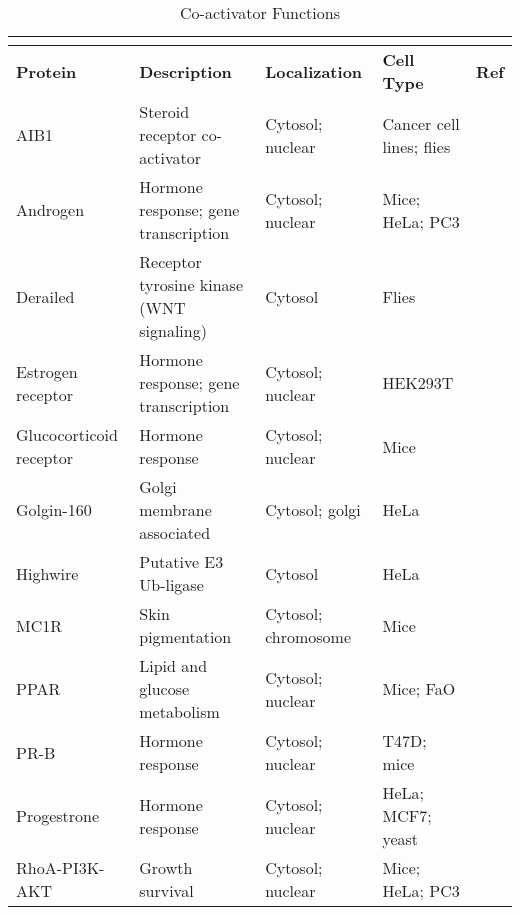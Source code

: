 \begin{longtabu} to \textwidth {X[1,l]X[1.2,l]X[1,l]X[1,l]X[0.4,c]}
  \caption{Co-activator Functions}\\
  \label{table:a-2}\\
  \toprule
  \textbf{Protein} & \textbf{Description} & \textbf{Localization} & \textbf{Cell Type} & \textbf{Ref}\\
  \midrule
  \endhead
  AIB1              & Steroid receptor co-activator            & Cytosol; nuclear    & Cancer cell lines; flies & \cite{Mani2006}\\
  Androgen          & Hormone response; gene transcription     & Cytosol; nuclear    & Mice; HeLa; PC3          & \cite{Khan2006}\\
  Derailed          & Receptor tyrosine kinase (WNT signaling) & Cytosol             & Flies                    & \cite{Chakraborty2015}\\
  Estrogen receptor & Hormone response; gene transcription     & Cytosol; nuclear    & HEK293T                  & \cite{Dhananjayan2006,Picard2008}\\
  Glucocorticoid receptor & Hormone response                   & Cytosol; nuclear    & Mice                     & \cite{Godavarthi2012}\\
  Golgin-160        & Golgi membrane associated                & Cytosol; golgi      & HeLa                     & \cite{Jung2005}\\
  Highwire          & Putative E3 Ub-ligase                    & Cytosol             & HeLa                     & \cite{Jung2005}\\
  MC1R              & Skin pigmentation                        & Cytosol; chromosome & Mice                     & \cite{Low2011}\\
  PPAR              & Lipid and glucose metabolism             & Cytosol; nuclear    & Mice; FaO                & \cite{Gopinathan2008}\\
  PR-B              & Hormone response                         & Cytosol; nuclear    & T47D; mice               & \cite{Ramamoorthy2010}\\
  Progestrone       & Hormone response                         & Cytosol; nuclear    & HeLa; MCF7; yeast        & \cite{Dhananjayan2006}\\
  RhoA-PI3K-AKT     & Growth survival                          & Cytosol; nuclear    & Mice; HeLa; PC3          & \cite{Khan2006,Srinivasan2011}\\
  \bottomrule
\end{longtabu}

